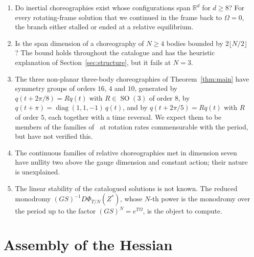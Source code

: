 \documentclass[11pt]{amsart}
\theoremstyle{definition}
\newcommand{\R}{\mathbb{R}}
\DeclareMathOperator{\SO}{SO}
\begin{document}
\begin{enumerate}
\item Do inertial choreographies exist whose configurations span $\R^d$ for $d\ge8$? For every rotating-frame solution that we continued in the frame back to $\Omega=0$, the branch either stalled or ended at a relative equilibrium.
\item Is the span dimension of a choreography of $N\ge4$ bodies bounded by $2\lfloor N/2\rfloor$? The bound holds throughout the catalogue and has the heuristic explanation of Section~\ref{sec:structure}, but it fails at $N=3$.
\item The three non-planar three-body choreographies of Theorem~\ref{thm:main} have symmetry groups of orders $16$, $4$ and $10$, generated by $q(t+2\pi/8)=Rq(t)$ with $R\in\SO(3)$ of order $8$, by $q(t+\pi)=\operatorname{diag}(1,1,-1)\,q(t)$, and by $q(t+2\pi/5)=Rq(t)$ with $R$ of order $5$, each together with a time reversal. We expect them to be members of the families of~\cite{Marchal2000,CFM2005,ChencinerFejoz2009,Ferrario2006} at rotation rates commensurable with the period, but have not verified this.
\item The continuous families of relative choreographies met in dimension seven have nullity two above the gauge dimension and constant action; their nature is unexplained.
\item The linear stability of the catalogued solutions is not known. The reduced monodromy $(GS)^{-1}D\Phi_{T/N}(Z^*)$, whose $N$-th power is the monodromy over the period up to the factor $(GS)^N=e^{T\Omega}$, is the object to compute.
\end{enumerate}

\appendix

\section{Assembly of the Hessian}\label{app:hessian}
\end{document}
